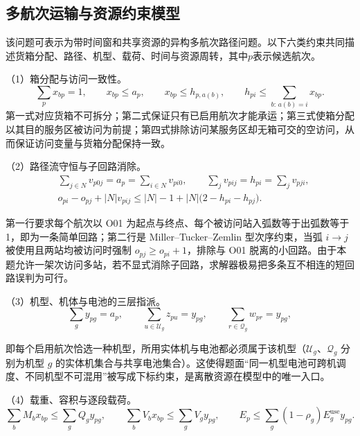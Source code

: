 \subsection{多航次运输与资源约束模型}

该问题可表示为带时间窗和共享资源的异构多航次路径问题。以下六类约束共同描述货箱分配、路径、机型、载荷、时间与资源周转，其中$p$表示候选航次。

{\heiti（1）箱分配与访问一致性。}
\begin{equation}
\sum_p x_{bp}=1,\qquad
x_{bp}\le a_p,\qquad
x_{bp}\le h_{p,a(b)},\qquad
h_{pi}\le\sum_{b:\,a(b)=i}x_{bp}.
\label{eq:q2-assign}
\end{equation}
第一式对应货箱不可拆分；第二式保证只有已启用航次才能承运；第三式使箱分配以其目的服务区被访问为前提；第四式排除访问某服务区却无箱可交的空访问，从而保证访问变量与货箱分配保持一致。

{\heiti（2）路径流守恒与子回路消除。}
\begin{align}
&\sum_{j\in N}v_{p0j}=a_p=\sum_{i\in N}v_{pi0},\qquad
\sum_j v_{pij}=h_{pi}=\sum_j v_{pji},\nonumber\\
&o_{pi}-o_{pj}+|N|v_{pij}\le|N|-1+|N|\bigl(2-h_{pi}-h_{pj}\bigr).
\label{eq:q2-route}
\end{align}

第一行要求每个航次以 O01 为起点与终点、每个被访问站入弧数等于出弧数等于 1，即为一条简单回路；第二行是 Miller--Tucker--Zemlin 型次序约束，当弧 $i\to j$ 被使用且两站均被访问时强制 $o_{pj}\ge o_{pi}+1$，排除与 O01 脱离的小回路。由于本题允许一架次访问多站，若不显式消除子回路，求解器极易把多条互不相连的短回路误判为可行。

{\heiti（3）机型、机体与电池的三层指派。}
\begin{equation}
\sum_g y_{pg}=a_p,\qquad
\sum_{u\in\mathcal{U}_g}z_{pu}=y_{pg},\qquad
\sum_{r\in\mathcal{Q}_g}w_{pr}=y_{pg},
\label{eq:q2-resource}
\end{equation}

即每个启用航次恰选一种机型，所用实体机与电池都必须属于该机型（$\mathcal{U}_g$、$\mathcal{Q}_g$ 分别为机型 $g$ 的实体机集合与共享电池集合）。这使得题面“同一机型电池可跨机调度、不同机型不可混用”被写成下标约束，是离散资源在模型中的唯一入口。

{\heiti（4）载重、容积与逐段载荷。}
\begin{equation}
\sum_b M_bx_{bp}\le\sum_g Q_gy_{pg},\qquad
\sum_b V_bx_{bp}\le\sum_g V_gy_{pg},\qquad
E_p\le\sum_g(1-\rho_g)E_g^{\mathrm{use}}y_{pg}.
\label{eq:q2-capacity}
\end{equation}

